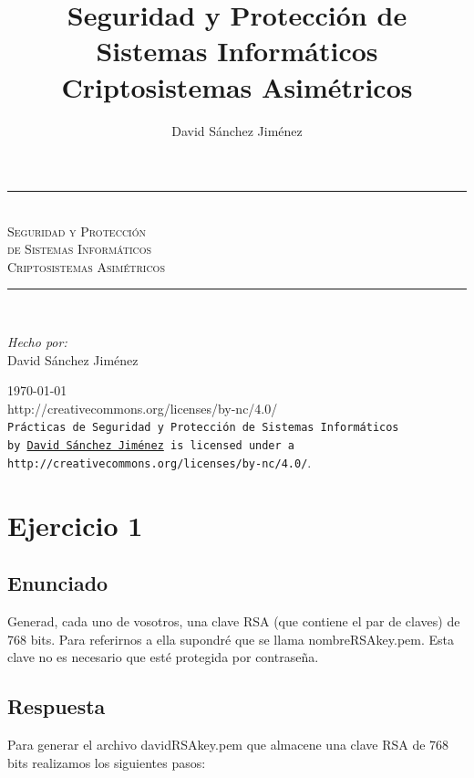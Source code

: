 \documentclass[10pt,a4paper,spanish]{report}
\title{Seguridad y Protección de Sistemas Informáticos \\
Criptosistemas Asimétricos}
\author{David Sánchez Jiménez}
\newcommand{\HRule}{\rule{\linewidth}{0.5mm}} %
\begin{document}
\begin{titlepage}
 \begin{center}
  \HRule \\[0.8cm]
  \textsc{\huge Seguridad y Protección \\ de Sistemas Informáticos \\[0.5cm] Criptosistemas Asimétricos}\\[1.6cm]
  \HRule \\[1cm]
  \begin{flushleft}
   \emph{Hecho por:}\\
   David Sánchez Jiménez
  \end{flushleft}
  \vspace{12cm}
  \large{\today}\\
  \vspace{0.5cm}
  {http://creativecommons.org/licenses/by-nc/4.0/}\\[0.5cm]
  \texttt{Prácticas de Seguridad y Protección de Sistemas Informáticos\\ by
   \href{mailto:dasaji92@gmail.com}{David Sánchez Jiménez} is licensed under a 
   {http://creativecommons.org/licenses/by-nc/4.0/}}.\\[3mm]
 \end{center}
\end{titlepage}

\tableofcontents
\newpage

\chapter{Ejercicio 1}

\section{Enunciado}
\noindent
Generad, cada uno de vosotros, una clave RSA (que contiene el par de claves) de 768 bits. Para referirnos a ella supondré que se llama nombreRSAkey.pem. Esta clave no es necesario que esté protegida por contraseña.

\section{Respuesta}
\noindent
Para generar el archivo davidRSAkey.pem que almacene una clave RSA de 768 bits realizamos los siguientes pasos:
\end{document}
